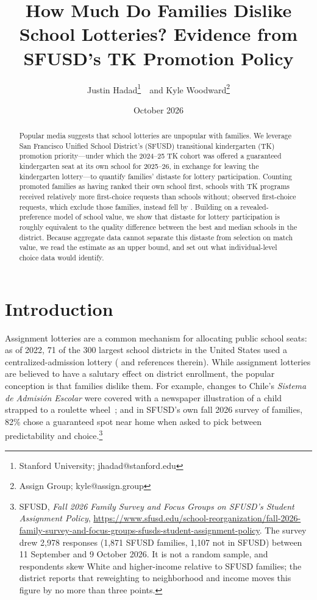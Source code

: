 \documentclass{article}
\title{How Much Do Families Dislike School Lotteries? Evidence from SFUSD's TK Promotion Policy}
\author{Justin Hadad\thanks{Stanford University; jhadad@stanford.edu}\ \ and Kyle Woodward\thanks{Assign Group; kyle@assign.group}}
\date{October 2026}
\begin{document}
\maketitle
{}

\begin{abstract}
Popular media suggests that school lotteries are unpopular with families. We leverage San Francisco Unified School District's (SFUSD) transitional kindergarten (TK) promotion priority---under which the 2024--25 TK cohort was offered a guaranteed kindergarten seat at its own school for 2025--26, in exchange for leaving the kindergarten lottery---to quantify families' distaste for lottery participation. Counting promoted families as having ranked their own school first, schools with TK programs received relatively more first-choice requests than schools without; observed first-choice requests, which exclude those families, instead fell by \numDidFirstTwoPct. Building on a revealed-preference model of school value, we show that distaste for lottery participation is roughly equivalent to the quality difference between the best and median schools in the district. Because aggregate data cannot separate this distaste from selection on match value, we read the estimate as an upper bound, and set out what individual-level choice data would identify.
\end{abstract}

\section{Introduction}
Assignment lotteries are a common mechanism for allocating public school seats: as of 2022, 71 of the 300 largest school districts in the United States used a centralized-admission lottery (\cite{lagosfranciscoEffectCentralizedAdmissionSchool} and references therein). While assignment lotteries are believed to have a salutary effect on district enrollment, the popular conception is that families dislike them. For example, changes to Chile's \textit{Sistema de Admisi\'{o}n Escolar} were covered with a newspaper illustration of a child strapped to a roulette wheel~\cite{cabalinEducacionPortadaVisualizacion2016}; and in SFUSD's own fall 2026 survey of families, 82\% chose a guaranteed spot near home when asked to pick between predictability and choice.\footnote{SFUSD, \emph{Fall 2026 Family Survey and Focus Groups on SFUSD's Student Assignment Policy}, \url{https://www.sfusd.edu/school-reorganization/fall-2026-family-survey-and-focus-groups-sfusds-student-assignment-policy}. The survey drew 2{,}978 responses (1{,}871 SFUSD families, 1{,}107 not in SFUSD) between 11 September and 9 October 2026. It is not a random sample, and respondents skew White and higher-income relative to SFUSD families; the district reports that reweighting to neighborhood and income moves this figure by no more than three points.}
\end{document}
